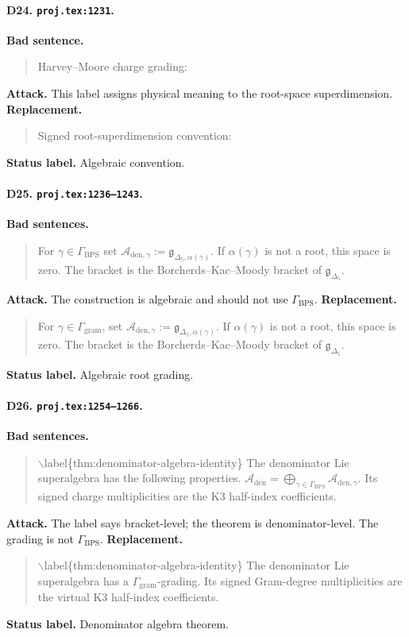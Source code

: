 \paragraph{D24. \texttt{proj.tex:1231}.}
\textbf{Bad sentence.}
\begin{quote}\small
Harvey--Moore charge grading:
\end{quote}
\textbf{Attack.}
This label assigns physical meaning to the root-space superdimension.
\textbf{Replacement.}
\begin{quote}\small
Signed root-superdimension convention:
\end{quote}
\textbf{Status label.} Algebraic convention.

\paragraph{D25. \texttt{proj.tex:1236--1243}.}
\textbf{Bad sentences.}
\begin{quote}\small
For \(\gamma\in\Gamma_{\mathrm{BPS}}\) set
\(\mathcal A_{\mathrm{den},\gamma}:=\mathfrak g_{\Delta_5,\alpha(\gamma)}\).
If \(\alpha(\gamma)\) is not a root, this space is zero.  The bracket is
the Borcherds--Kac--Moody bracket of \(\mathfrak g_{\Delta_5}\).
\end{quote}
\textbf{Attack.}
The construction is algebraic and should not use \(\Gamma_{\mathrm{BPS}}\).
\textbf{Replacement.}
\begin{quote}\small
For \(\gamma\in\Gamma_{\mathrm{gram}}\), set
\(\mathcal A_{\mathrm{den},\gamma}:=\mathfrak g_{\Delta_5,\alpha(\gamma)}\).
If \(\alpha(\gamma)\) is not a root, this space is zero.  The bracket is
the Borcherds--Kac--Moody bracket of \(\mathfrak g_{\Delta_5}\).
\end{quote}
\textbf{Status label.} Algebraic root grading.

\paragraph{D26. \texttt{proj.tex:1254--1266}.}
\textbf{Bad sentences.}
\begin{quote}\small
\(\backslash\)label\{thm:denominator-algebra-identity\}
The denominator Lie superalgebra has the following properties.
\(\mathcal A_{\mathrm{den}}=\bigoplus_{\gamma\in\Gamma_{\mathrm{BPS}}}
\mathcal A_{\mathrm{den},\gamma}\).
Its signed charge multiplicities are the K3 half-index coefficients.
\end{quote}
\textbf{Attack.}
The label says bracket-level; the theorem is denominator-level.  The
grading is not \(\Gamma_{\mathrm{BPS}}\).
\textbf{Replacement.}
\begin{quote}\small
\(\backslash\)label\{thm:denominator-algebra-identity\}
The denominator Lie superalgebra has a
\(\Gamma_{\mathrm{gram}}\)-grading.  Its signed Gram-degree
multiplicities are the virtual K3 half-index coefficients.
\end{quote}
\textbf{Status label.} Denominator algebra theorem.

